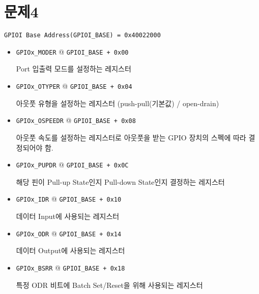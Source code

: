 \documentclass{article}
\begin{document}
    \section*{문제4 \normalsize{}}

    \begin{mdframed}
        \texttt{GPIOI Base Address(GPIOI\_BASE) = 0x40022000}

        \begin{itemize}
            \item \texttt{GPIOx\_MODER} @ \texttt{GPIOI\_BASE + 0x00}
            
            Port 입출력 모드를 설정하는 레지스터

            \item \texttt{GPIOx\_OTYPER} @ \texttt{GPIOI\_BASE + 0x04}
            
            아웃풋 유형을 설정하는 레지스터 (push-pull(기본값) / open-drain)

            \item \texttt{GPIOx\_OSPEEDR} @ \texttt{GPIOI\_BASE + 0x08}
            
            아웃풋 속도를 설정하는 레지스터로 아웃풋을 받는 GPIO 장치의 스펙에 따라 결정되어야 함.

            \item \texttt{GPIOx\_PUPDR} @ \texttt{GPIOI\_BASE + 0x0C}
            
            해당 핀이 Pull-up State인지 Pull-down State인지 결정하는 레지스터

            \item \texttt{GPIOx\_IDR} @ \texttt{GPIOI\_BASE + 0x10}
            
            데이터 Input에 사용되는 레지스터

            \item \texttt{GPIOx\_ODR} @ \texttt{GPIOI\_BASE + 0x14}
            
            데이터 Output에 사용되는 레지스터
            
            \item \texttt{GPIOx\_BSRR} @ \texttt{GPIOI\_BASE + 0x18}
            
            특정 ODR 비트에 Batch Set/Reset을 위해 사용되는 레지스터


\end{itemize}
\end{mdframed}
\end{document}
